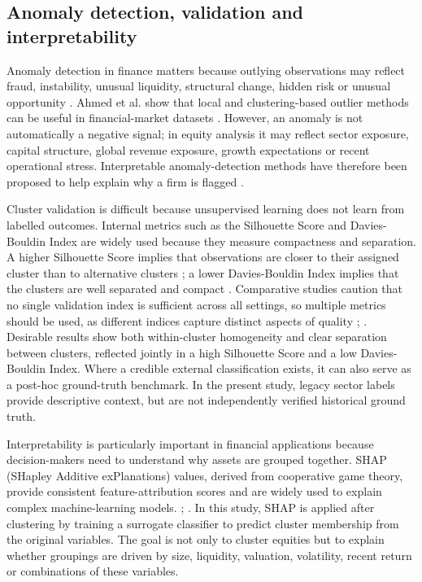 \subsection{Anomaly detection, validation and interpretability}

Anomaly detection in finance matters because outlying observations may reflect fraud, instability, unusual liquidity, structural change, hidden risk or unusual opportunity \citep{ahmed2016}. Ahmed et al. show that local and clustering-based outlier methods can be useful in financial-market datasets \citep{ahmed2017}. However, an anomaly is not automatically a negative signal; in equity analysis it may reflect sector exposure, capital structure, global revenue exposure, growth expectations or recent operational stress. Interpretable anomaly-detection methods have therefore been proposed to help explain why a firm is flagged \citep{cheong2021}.


Cluster validation is difficult because unsupervised learning does not learn from labelled outcomes. Internal metrics such as the Silhouette Score and Davies-Bouldin Index are widely used because they measure compactness and separation. A higher Silhouette Score implies that observations are closer to their assigned cluster than to alternative clusters \citep{rousseeuw1987}; a lower Davies-Bouldin Index implies that the clusters are well separated and compact \citep{davies1979}. Comparative studies caution that no single validation index is sufficient across all settings, so multiple metrics should be used, as different indices capture distinct aspects of quality \citep{arbelaitz2013}; \citep{vendramin2010}. Desirable results show both within-cluster homogeneity and clear separation between clusters, reflected jointly in a high Silhouette Score and a low Davies-Bouldin Index. Where a credible external classification exists, it can also serve as a post-hoc ground-truth benchmark. In the present study, legacy sector labels provide descriptive context, but are not independently verified historical ground truth.


Interpretability is particularly important in financial applications because decision-makers need to understand why assets are grouped together. SHAP (SHapley Additive exPlanations) values, derived from cooperative game theory, provide consistent feature-attribution scores and are widely used to explain complex machine-learning models. \citep{merrick2020}; \citep{rozemberczki2022}. In this study, SHAP is applied after clustering by training a surrogate classifier to predict cluster membership from the original variables. The goal is not only to cluster equities but to explain whether groupings are driven by size, liquidity, valuation, volatility, recent return or combinations of these variables.


